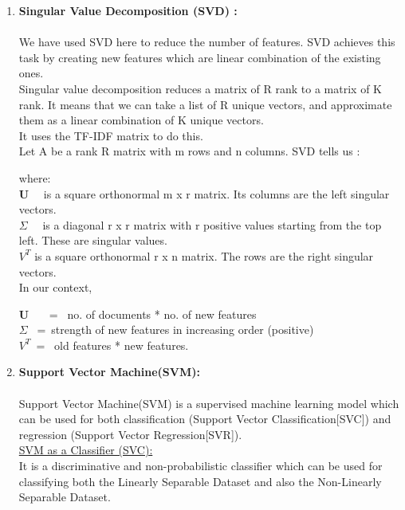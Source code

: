 \documentclass{report}
\begin{document}
\begin{enumerate}[label=\Roman*.]
 \item \textbf{Singular Value Decomposition (SVD) :}\\ \\
We have used SVD here to reduce the number of features. SVD achieves this task by creating new features which are linear combination of the existing ones.\\
Singular value decomposition reduces a matrix of R rank to a matrix of K rank.
It means that we can take a list of R unique vectors, and approximate them as a linear combination of K unique vectors.\\
It uses the TF-IDF matrix to do this.\\
Let A be a rank R matrix with m rows and n columns. SVD tells us :
\begin{center} 
{\huge {}}
\end{center}
where:\\
{\huge \textbf{U} } \ \ is a square orthonormal m x r matrix. Its columns are the left singular vectors.\\
\linebreak
{\huge \textbf{\(\Sigma \)}} \ \ is a diagonal r x r matrix with r positive values starting from the top left. These are  singular values.\\
\linebreak
{\huge \textbf{\(V^T \)} } is a square orthonormal r x n matrix. The rows are the right singular vectors.\\
In our context,

{\huge \textbf{U}} \ \ \ = \  no. of documents * no. of new features\\ \linebreak
{\huge \textbf{\(\Sigma \)} } \ =\  strength of new features in increasing order (positive)\\ \linebreak
{\huge \textbf{\(V^T \)}}\ = \  old features * new features.\\

\item \textbf{Support Vector Machine(SVM):}\\ \\
Support Vector Machine(SVM) is a supervised machine learning model which can be used for both classification (Support Vector Classification[SVC]) and regression (Support Vector Regression[SVR]).\\ \linebreak
\underline{SVM as a Classifier (SVC):}\\ \linebreak
It is a discriminative and non-probabilistic classifier which can be used for classifying both the Linearly Separable Dataset and also the Non-Linearly Separable Dataset.


\end{enumerate}
\end{document}
